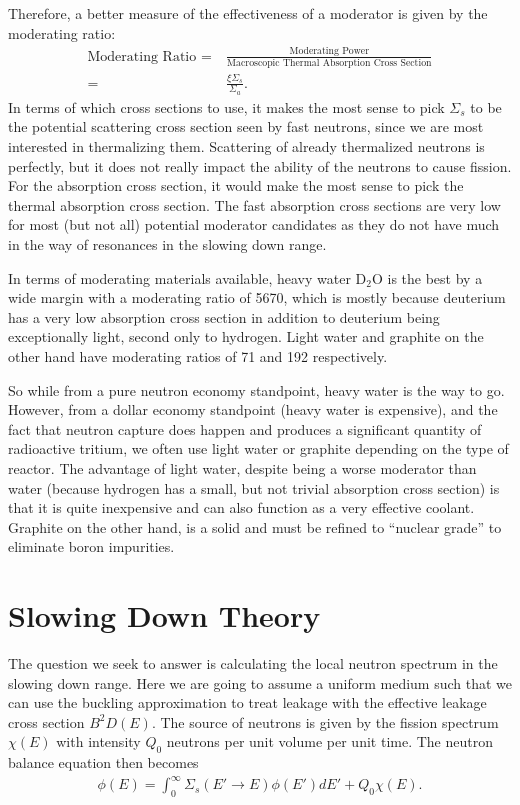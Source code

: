 Therefore, a better measure of the effectiveness of a moderator is given by the moderating ratio:
\begin{align}
  \text{Moderating Ratio } = &\ \frac{\text{Moderating Power}}{\text{Macroscopic Thermal Absorption Cross Section}} \nonumber \\
  = &\ \frac{ \xi \Sigma_s }{ \Sigma_a } .
\end{align}
In terms of which cross sections to use, it makes the most sense to pick $\Sigma_s$ to be the potential scattering cross section seen by fast neutrons, since we are most interested in thermalizing them. Scattering of already thermalized neutrons is perfectly, but it does not really impact the ability of the neutrons to cause fission. For the absorption cross section, it would make the most sense to pick the thermal absorption cross section. The fast absorption cross sections are very low for most (but not all) potential moderator candidates as they do not have much in the way of resonances in the slowing down range.

In terms of moderating materials available, heavy water D$_2$O is the best by a wide margin with a moderating ratio of 5670, which is mostly because deuterium has a very low absorption cross section in addition to deuterium being exceptionally light, second only to hydrogen. Light water and graphite on the other hand have moderating ratios of 71 and 192 respectively. 

So while from a pure neutron economy standpoint, heavy water is the way to go. However, from a dollar economy standpoint (heavy water is expensive), and the fact that neutron capture does happen and produces a significant quantity of radioactive tritium, we often use light water or graphite depending on the type of reactor. The advantage of light water, despite being a worse moderator than water (because hydrogen has a small, but not trivial absorption cross section) is that it is quite inexpensive and can also function as a very effective coolant. Graphite on the other hand, is a solid and must be refined to ``nuclear grade'' to eliminate boron impurities.

\section{Slowing Down Theory}

The question we seek to answer is calculating the local neutron spectrum in the slowing down range. Here we are going to assume a uniform medium such that we can use the buckling approximation to treat leakage with the effective leakage cross section $B^2D(E)$. The source of neutrons is given by the fission spectrum $\chi(E)$ with intensity $Q_0$ neutrons per unit volume per unit time. The neutron balance equation then becomes
\begin{align}
  [ B^2 D(E) + \Sigma_t(E) ] \phi(E) = \int_0^\infty \Sigma_s(E' \rightarrow E) \phi(E') dE' + Q_0 \chi(E) . \label{Eq:thermalization_neutronBalanceEquation_Energy_General}
\end{align}

